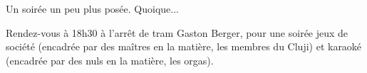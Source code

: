 Un soirée un peu plus posée. Quoique...

Rendez-vous à 18h30 à l'arrêt de tram Gaston Berger, pour une soirée jeux de société (encadrée par des maîtres
en la matière, les membres du Cluji) et karaoké (encadrée
par des nuls en la matière, les orgas).
